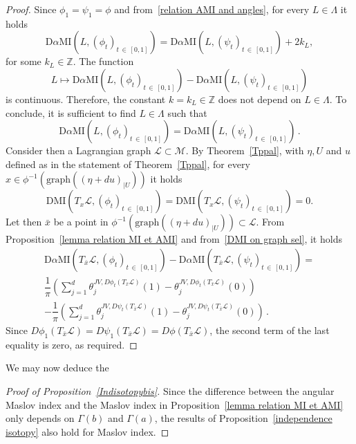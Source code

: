 \documentclass[AHL, Unicode, longabstracts, published]{cedram}
\newcommand*\M{\mathcal{M}}
\newcommand*\cl{\mathcal{L}}
\newcommand{\DMI}{\mathrm{DMI}}
\newcommand{\MI}{\mathrm{MI}}
\newcommand{\rmD}{\mathrm{D}}
\newcommand{\Graph}{\mathrm{graph}}
\newcommand*\Z{\mathbb{Z}}
\begin{document}
\begin{proof}
Since $\phi_1=\psi_1=\phi$ and from~\eqref{relation AMI and angles}, for every $L\in\Lambda$ it holds
\[
\rmD\alpha\MI\left(L,(\phi_t)_{t\,\in\,[0,1]}\right)=\rmD\alpha\MI\left(L,(\psi_t)_{t\,\in\,[0,1]}\right)+ 2k_L,
\]
for some $k_L\in\Z$. The function
\[
L\mapsto \rmD\alpha\MI\left(L,(\phi_t)_{t\,\in\,[0,1]}\right)-\rmD\alpha\MI\left(L,(\psi_t)_{t\,\in\,[0,1]}\right)
\]
is continuous. Therefore, the constant $k=k_L\in\Z$ does not depend on $L\in\Lambda$. To conclude, it is sufficient to find $L\in\Lambda$ such that
\begin{equation}\label{goal eq}
\rmD\alpha\MI\left(L,(\phi_t)_{t\,\in\,[0,1]}\right)=\rmD\alpha\MI\left(L,(\psi_t)_{t\,\in\,[0,1]}\right)\,.
\end{equation}
Consider then a Lagrangian graph $\cl\subset\M$. By Theorem~\ref{Tppal}, with $\eta,U$ and $u$ defined as in the statement of Theorem~\ref{Tppal}, for every $x\in\phi^{-1}(\Graph((\eta+du)_{|U}))$ it holds
\begin{equation}\label{DMI on graph sel}
\DMI\left(T_x\cl,(\phi_t)_{t\,\in\,[0,1]}\right)=\DMI\left(T_x\cl,(\psi_t)_{t\,\in\,[0,1]}\right)=0.
\end{equation}
Let then $\bar x$ be a point in $ \phi^{-1}(\Graph((\eta+du)_{|U}))\subset \cl$. From Proposition~\ref{lemma relation MI et AMI} and from~\eqref{DMI on graph sel}, it holds
\begin{multline*}
\rmD\alpha\MI\left(T_{\bar x}\cl,(\phi_t)_{t\,\in\,[0,1]}\right)-\rmD\alpha\MI\left(T_{\bar x}\cl,(\psi_t)_{t\,\in\,[0,1]}\right)=
\\
\dfrac{1}{\pi}\left(\sum_{j=1}^d\theta_j^{JV,D\phi_t\left(T_{\bar x}\cl\right)}(1)-\theta_j^{JV,D\phi_t\left(T_{\bar x}\cl\right)}(0)\right)\\
-\dfrac{1}{\pi}\left(\sum_{j=1}^d\theta_j^{JV,D\psi_t\left(T_{\bar x}\cl\right)}(1)-\theta_j^{JV,D\psi_t\left(T_{\bar x}\cl\right)}(0)\right)\,.
\end{multline*}
Since $D\phi_1(T_{\bar x}\cl)=D\psi_1(T_{\bar x}\cl)=D\phi(T_{\bar x}\cl)$, the second term of the last equality is zero, as required.
\end{proof}

We may now deduce the
\begin{proof}[Proof of Proposition~\ref{Indisotopybis}]
Since the difference between the angular Maslov index and the Maslov index in Proposition~\ref{lemma relation MI et AMI} only depends on $\Gamma(b)$ and $\Gamma(a)$, the results of Proposition~\ref{independence isotopy} also hold for Maslov index.
\end{proof}
\end{document}
